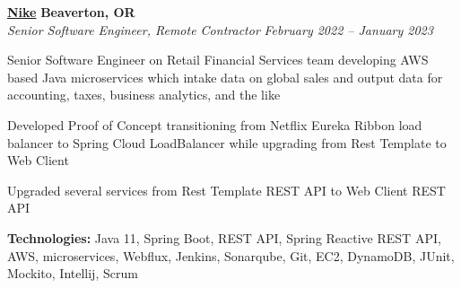 %
    \headerrow
        {\textbf{\href{https://www.nike.com/}{Nike}}}
        {\textbf{Beaverton, OR}}
    \\
    \headerrow
        {\emph{Senior Software Engineer, Remote Contractor}}
        {\emph{February 2022 -- January 2023}}
    \begin{itemize*}
        \item Senior Software Engineer on Retail Financial Services team developing AWS based Java microservices which intake data on global sales and output data for accounting, taxes, business analytics, and the like
        \item Developed Proof of Concept transitioning from Netflix Eureka Ribbon load balancer to Spring Cloud LoadBalancer while upgrading from Rest Template to Web Client
        \item Upgraded several services from Rest Template REST API to Web Client REST API
    \end{itemize*}

    \hspace{1.0em}
        {\textbf{Technologies:} Java 11, Spring Boot, REST API, Spring Reactive REST API, AWS, microservices, Webflux, Jenkins, Sonarqube, Git, EC2, DynamoDB, JUnit, Mockito, Intellij, Scrum}

